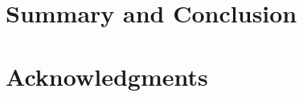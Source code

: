 \documentclass[submit, 12pt]{aiaa-pretty-modified}
\begin{document}


\section{Summary and Conclusion}

\section{Acknowledgments}

\newpage


\nocite{*}
\end{document}
